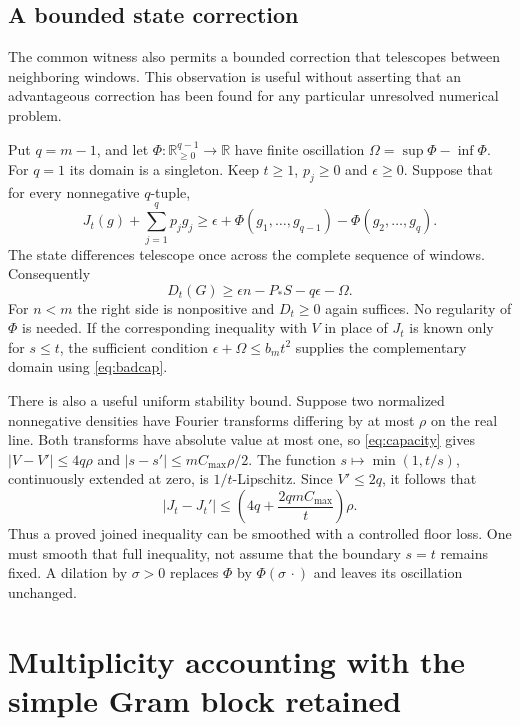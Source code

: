 \documentclass[11pt]{amsart}
\numberwithin{equation}{section}
\newcommand{\R}{\mathbb R}
\begin{document}
\subsection{A bounded state correction}
\label{sec:potential}

The common witness also permits a bounded correction that telescopes
between neighboring windows. This observation is useful without
asserting that an advantageous correction has been found for any
particular unresolved numerical problem.

Put $q=m-1$, and let $\Phi:\R_{\ge0}^{q-1}\to\R$ have finite
oscillation $\Omega=\sup\Phi-\inf\Phi$. For $q=1$ its domain is a
singleton. Keep $t\ge1$, $p_j\ge0$ and $\epsilon\ge0$. Suppose
that for every nonnegative $q$-tuple,
\begin{equation}
 J_t(g)+\sum_{j=1}^{q}p_jg_j
 \ge\epsilon+\Phi(g_1,\ldots,g_{q-1})
                   -\Phi(g_2,\ldots,g_q).\label{eq:subaction}
\end{equation}
The state differences telescope once across the complete sequence of
windows. Consequently
\begin{equation}
 D_t(G)\ge\epsilon n-P_*S-q\epsilon-\Omega.
 \label{eq:potentialtransfer}
\end{equation}
For $n<m$ the right side is nonpositive and $D_t\ge0$ again suffices.
No regularity of $\Phi$ is needed. If the corresponding inequality
with $V$ in place of $J_t$ is known only for $s\le t$, the sufficient
condition $\epsilon+\Omega\le b_mt^2$ supplies the complementary
domain using \eqref{eq:badcap}.

There is also a useful uniform stability bound. Suppose two normalized
nonnegative densities have Fourier transforms differing by at most
$\rho$ on the real line. Both transforms have absolute value at most
one, so \eqref{eq:capacity} gives $|V-V'|\le4q\rho$ and
$|s-s'|\le mC_{\max}\rho/2$. The function
$s\mapsto\min(1,t/s)$, continuously extended at zero, is
$1/t$-Lipschitz. Since $V'\le2q$, it follows that
\begin{equation}
 |J_t-J_t'|\le
 \left(4q+\frac{2qmC_{\max}}t\right)\rho.\label{eq:Jstability}
\end{equation}
Thus a proved joined inequality can be smoothed with a controlled
floor loss. One must smooth that full inequality, not assume that the
boundary $s=t$ remains fixed. A dilation by $\sigma>0$ replaces $\Phi$ by
$\Phi(\sigma\,\cdot)$ and leaves its oscillation unchanged.

\section{Multiplicity accounting with the simple Gram block retained}
\label{sec:multiplicity}
\end{document}
